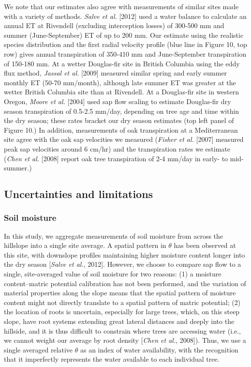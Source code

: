 We note that our estimates also agree with measurements of similar sites made with a variety of methods.  \textit{Salve et al.} [2012] used a water balance to calculate an annual ET at Rivendell (excluding interception losses) of 300-500 mm and summer (June-September) ET  of up to 200 mm.  Our estimate using the realistic species distribution and the first radial velocity profile (blue line in Figure 10, top row) gives annual transpiration of 350-410 mm and June-September transpiration of 150-180 mm.  At a wetter Douglas-fir site in British Columbia using the eddy flux method, \textit{Jassal et al.} [2009] measured similar spring and early summer monthly ET (50-70 mm/month), although late summer ET was greater at the wetter British Columbia site than at Rivendell.  At a Douglas-fir site in western Oregon, \textit{Moore et al.} [2004] used sap flow scaling to estimate Douglas-fir dry season transpiration of 0.5-2.5 mm/day, depending on tree age and time within the dry season; these rates bracket our dry season estimates (top left panel of Figure 10.)  In addition, measurements of oak transpiration at a Mediterranean site agree with the oak sap velocities we measured (\textit{Fisher et al.} [2007] measured peak sap velocities around 6 cm/hr) and the transpiration rates we estimate (\textit{Chen et al.} [2008] report oak tree transpiration of 2-4 mm/day in early- to mid-summer.)

\subsection{Uncertainties and limitations}

\subsubsection{Soil moisture}
In this study, we aggregate measurements of soil moisture from across the hillslope into a single site average.  A spatial pattern in $\theta$ has been observed at this site, with downslope profiles maintaining higher moisture content longer into the dry season [\textit{Salve et al.}, 2012].  However, we choose to compare sap flow to a single, site-averaged value of soil moisture for two reasons: (1) a moisture content--matric potential calibration has not been performed, and the variation of material properties along the slope means that the spatial pattern of moisture content might not directly translate to a spatial pattern of matric potential; (2) the location of roots is uncertain, especially for large trees, which, on this steep slope, have root systems extending great lateral distances and deeply into the hillside, and it is thus difficult to constrain where trees are accessing water (i.e., we cannot weight our average by root density [\textit{Chen et al.}, 2008]).  Thus, we use a single averaged relative $\theta$ as an index of water availability, with the recognition that it imperfectly represents the water available to each individual tree.

